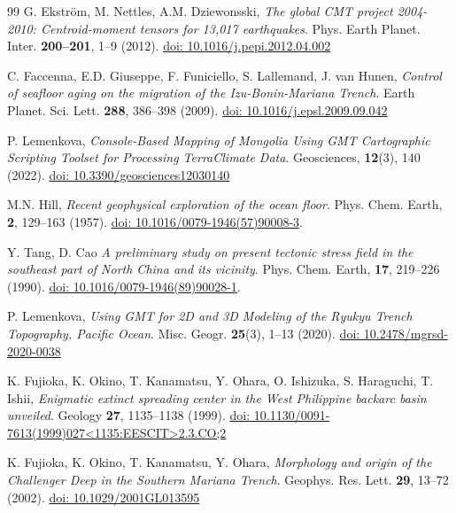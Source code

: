 \documentclass{rrparticle}
\begin{document}
\begin{thebibliography}{99}
 G. Ekstr\"om, M. Nettles, A.M. Dziewonsski, \emph{The global CMT project 2004-2010: Centroid-moment tensors for 13,017 earthquakes}. Phys. Earth Planet. Inter. \textbf{200--201}, 1--9 (2012). \href{https://doi.org/10.1016/j.pepi.2012.04.002}{doi: 10.1016/j.pepi.2012.04.002}

 C. Faccenna, E.D. Giuseppe, F. Funiciello, S. Lallemand, J. van Hunen, \emph{Control of seafloor aging on the migration of the Izu-Bonin-Mariana Trench}. Earth Planet. Sci. Lett. \textbf{288}, 386--398 (2009). \href{https://doi.org/10.1016/j.epsl.2009.09.042}{doi: 10.1016/j.epsl.2009.09.042}

P. Lemenkova, \emph{Console-Based Mapping of Mongolia Using GMT Cartographic Scripting Toolset for Processing TerraClimate Data}. Geosciences, \textbf{12}(3), 140 (2022). \href{https://doi.org/10.3390/geosciences12030140}{doi: 10.3390/geosciences12030140}

 M.N. Hill, \emph{Recent geophysical exploration of the ocean floor}. Phys. Chem. Earth, \textbf{2}, 129--163 (1957). \href{https://doi.org/10.1016/0079-1946(57)90008-3}{doi: 10.1016/0079-1946(57)90008-3}.

 Y. Tang, D. Cao \emph{A preliminary study on present tectonic stress field in the southeast part of North China and its vicinity}. Phys. Chem. Earth, \textbf{17}, 219--226 (1990). \href{https://doi.org/10.1016/0079-1946(89)90028-1}{doi: 10.1016/0079-1946(89)90028-1}.

 P. Lemenkova, \emph{Using GMT for 2D and 3D Modeling of the Ryukyu Trench Topography, Pacific Ocean}. Misc. Geogr. \textbf{25}(3), 1--13 (2020). \href{https://doi.org/10.2478/mgrsd-2020-0038}{doi: 10.2478/mgrsd-2020-0038}

 K. Fujioka, K. Okino, T. Kanamatsu, Y. Ohara, O. Ishizuka, S. Haraguchi, T. Ishii, \emph{Enigmatic extinct spreading center in the West Philippine backarc basin unveiled}. Geology \textbf{27}, 1135--1138 (1999). \href{https://doi.org/10.1130/0091-7613(1999)027<1135:EESCIT>2.3.CO;2}{doi: 10.1130/0091-7613(1999)027<1135:EESCIT>2.3.CO;2}

 K. Fujioka, K. Okino, T. Kanamatsu, Y. Ohara, \emph{Morphology and origin of the Challenger Deep in the Southern Mariana Trench}. Geophys. Res. Lett. \textbf{29}, 13--72 (2002). \href{https://doi.org/10.1029/2001GL013595}{doi: 10.1029/2001GL013595}


\end{thebibliography}
\end{document}
